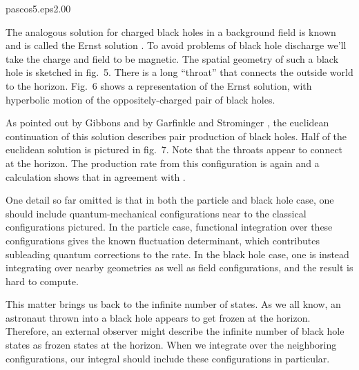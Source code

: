 {pascos5.eps}{2.00}

The analogous solution for charged black holes in a background field is
known and is called the Ernst solution . To avoid problems
of black hole discharge we'll take the charge and field to be magnetic.
The spatial geometry of such a black hole is sketched in fig.~5. There
is a long ``throat'' that connects the outside world to the horizon.
Fig.~6 shows a representation of the Ernst solution, with hyperbolic
motion of the oppositely-charged pair of black holes.


As pointed out by Gibbons  and by Garfinkle and Strominger
, the euclidean continuation of this solution describes pair
production of black holes. Half of the euclidean
solution is pictured in fig.~7.
Note that the throats appear to connect at the horizon. The production
rate from this configuration is again
%
\eqn{}
%
and a calculation  shows that
%
\eqn{}
%
in agreement with \prrate.


One detail so far omitted is that in both the particle and black hole
case, one should include quantum-mechanical configurations near to the
classical configurations pictured. In the particle case, functional
integration over these configurations gives the known fluctuation
determinant, which contributes
subleading quantum corrections to the rate.
In the black hole case, one is instead integrating over
nearby geometries as well as field configurations, and the result is
hard to compute.

This matter brings us back to the infinite number of states. As we all
know, an astronaut thrown into a black hole appears to get frozen at the
horizon. Therefore, an external observer might describe the infinite
number of black hole states as frozen states at the horizon. When we
integrate over the
neighboring configurations, our integral should include these
configurations in particular.

